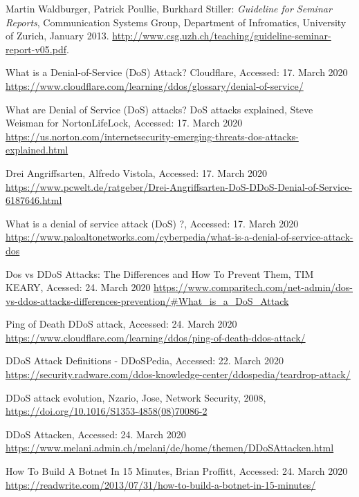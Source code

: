 \begin{thebibliography}{99}
 Martin Waldburger, Patrick Poullie, Burkhard Stiller: \emph{Guideline for Seminar Reports}, Communication Systems Group, Department of Infromatics, University of Zurich, January 2013. \url{http://www.csg.uzh.ch/teaching/guideline-seminar-report-v05.pdf}.

 What is a Denial-of-Service (DoS) Attack? Cloudflare, Accessed: 17. March 2020 \url{https://www.cloudflare.com/learning/ddos/glossary/denial-of-service/}

 What are Denial of Service (DoS) attacks? DoS attacks explained, Steve Weisman for NortonLifeLock, Accessed: 17. March 2020 \url{https://us.norton.com/internetsecurity-emerging-threats-dos-attacks-explained.html}

 Drei Angriffsarten, Alfredo Vistola, Accessed: 17. March 2020 \url{https://www.pcwelt.de/ratgeber/Drei-Angriffsarten-DoS-DDoS-Denial-of-Service-6187646.html}

 What is a denial of service attack (DoS) ?,  Accessed: 17. March 2020 \url{https://www.paloaltonetworks.com/cyberpedia/what-is-a-denial-of-service-attack-dos}

 Dos vs DDoS Attacks: The Differences and How To Prevent Them, TIM KEARY,  Acessed: 24. March 2020 \url{https://www.comparitech.com/net-admin/dos-vs-ddos-attacks-differences-prevention/#What_is_a_DoS_Attack}

 Ping of Death DDoS attack, Accessed: 24. March 2020 \url{https://www.cloudflare.com/learning/ddos/ping-of-death-ddos-attack/}

 DDoS Attack Definitions - DDoSPedia, Accessed: 22. March 2020 \url{https://security.radware.com/ddos-knowledge-center/ddospedia/teardrop-attack/}

 DDoS attack evolution, Nzario, Jose, Network Security, 2008, \url{https://doi.org/10.1016/S1353-4858(08)70086-2}

 DDoS Attacken, Accessed: 24. March 2020 \url{https://www.melani.admin.ch/melani/de/home/themen/DDoSAttacken.html}

 How To Build A Botnet In 15 Minutes, Brian Proffitt, Accessed: 24. March 2020 \url{https://readwrite.com/2013/07/31/how-to-build-a-botnet-in-15-minutes/}


\end{thebibliography}

